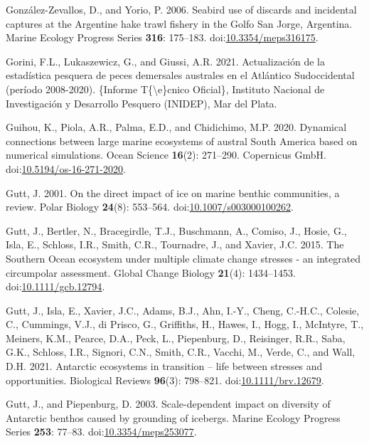 \documentclass[
]{article}
\newlength{\cslhangindent}
\newenvironment{CSLReferences}[2] %
 {\begin{list}{}{%
  \setlength{\itemindent}{0pt}
  \setlength{\leftmargin}{0pt}
  \setlength{\parsep}{0pt}
  \ifodd #1
   \setlength{\leftmargin}{\cslhangindent}
   \setlength{\itemindent}{-1\cslhangindent}
  \fi
  \setlength{\itemsep}{#2\baselineskip}}}
 {\end{list}}
\begin{document}
\begin{CSLReferences}{1}{0}
González-Zevallos, D., and Yorio, P. 2006. Seabird use of discards and
incidental captures at the {Argentine} hake trawl fishery in the {Golfo
San Jorge}, {Argentina}. Marine Ecology Progress Series \textbf{316}:
175--183.
doi:\href{https://doi.org/10.3354/meps316175}{10.3354/meps316175}.

Gorini, F.L., Lukaszewicz, G., and Giussi, A.R. 2021. {Actualizaci{ó}n
de la estad{í}stica pesquera de peces demersales australes en el
Atl{á}ntico Sudoccidental (per{í}odo 2008-2020)}. \{Informe
T\{\textbackslash\textquotesingle e\}cnico Oficial\}, Instituto Nacional
de Investigaci{ó}n y Desarrollo Pesquero (INIDEP), Mar del Plata.

Guihou, K., Piola, A.R., Palma, E.D., and Chidichimo, M.P. 2020.
Dynamical connections between large marine ecosystems of austral {South
America} based on numerical simulations. Ocean Science \textbf{16}(2):
271--290. Copernicus GmbH.
doi:\href{https://doi.org/10.5194/os-16-271-2020}{10.5194/os-16-271-2020}.

Gutt, J. 2001. On the direct impact of ice on marine benthic
communities, a review. Polar Biology \textbf{24}(8): 553--564.
doi:\href{https://doi.org/10.1007/s003000100262}{10.1007/s003000100262}.

Gutt, J., Bertler, N., Bracegirdle, T.J., Buschmann, A., Comiso, J.,
Hosie, G., Isla, E., Schloss, I.R., Smith, C.R., Tournadre, J., and
Xavier, J.C. 2015. The {Southern Ocean} ecosystem under multiple climate
change stresses - an integrated circumpolar assessment. Global Change
Biology \textbf{21}(4): 1434--1453.
doi:\href{https://doi.org/10.1111/gcb.12794}{10.1111/gcb.12794}.

Gutt, J., Isla, E., Xavier, J.C., Adams, B.J., Ahn, I.-Y., Cheng,
C.-H.C., Colesie, C., Cummings, V.J., di Prisco, G., Griffiths, H.,
Hawes, I., Hogg, I., McIntyre, T., Meiners, K.M., Pearce, D.A., Peck,
L., Piepenburg, D., Reisinger, R.R., Saba, G.K., Schloss, I.R., Signori,
C.N., Smith, C.R., Vacchi, M., Verde, C., and Wall, D.H. 2021. Antarctic
ecosystems in transition -- life between stresses and opportunities.
Biological Reviews \textbf{96}(3): 798--821.
doi:\href{https://doi.org/10.1111/brv.12679}{10.1111/brv.12679}.

Gutt, J., and Piepenburg, D. 2003. Scale-dependent impact on diversity
of {Antarctic} benthos caused by grounding of icebergs. Marine Ecology
Progress Series \textbf{253}: 77--83.
doi:\href{https://doi.org/10.3354/meps253077}{10.3354/meps253077}.


\end{CSLReferences}
\end{document}
